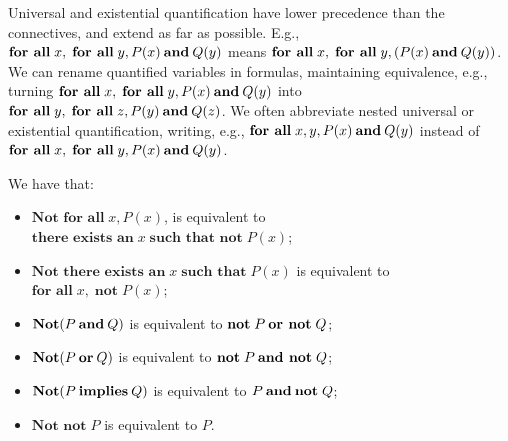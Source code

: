 Universal and existential quantification have lower precedence
than the connectives, and extend as far as possible. E.g.,
$\textbf{for all}\; x, \;\textbf{for all}\; y, P(x)\mathbin{\mathbf{and}} Q(y)$ means
$\textbf{for all}\; x, \;\textbf{for all}\; y, (P(x)\mathbin{\mathbf{and}} Q(y))$.
We can rename quantified variables in formulas, maintaining equivalence,
e.g., turning
$\textbf{for all}\; x, \;\textbf{for all}\; y, P(x)\mathbin{\mathbf{and}} Q(y)$ into
$\textbf{for all}\; y, \;\textbf{for all}\; z, P(y)\mathbin{\mathbf{and}} Q(z)$.
We often abbreviate nested universal or existential quantification,
writing, e.g., 
$\textbf{for all}\; x, y, P(x)\mathbin{\mathbf{and}} Q(y)$ instead of
$\textbf{for all}\; x, \;\textbf{for all}\; y, P(x)\mathbin{\mathbf{and}} Q(y)$.

We have that:
\begin{itemize}
\item $\textbf{Not for all}\; x, P(x)$, is equivalent to
  $\textbf{there exists an}\; x \;\textbf{such that not}\; P(x)$;

\item $\textbf{Not there exists an}\; x \;\textbf{such that}\; P(x)$ is
  equivalent to $\textbf{for all}\; x, \;\textbf{not}\; P(x)$;

\item $\textbf{Not} (P \mathbin{\mathbf{and}} Q)$ is equivalent to
  $\textbf{not}\; P \mathbin{\mathbf{or}} \,\textbf{not}\; Q$;

\item $\textbf{Not} (P \mathbin{\mathbf{or}} Q)$ is equivalent to $\textbf{not}\;
  P \mathbin{\mathbf{and}} \,\textbf{not}\; Q$;

\item $\textbf{Not} (P \mathbin{\mathbf{implies}} Q)$ is equivalent to $P
  \mathbin{\mathbf{and}} \textbf{not}\; Q$;

\item $\textbf{Not not}\; P$ is equivalent to $P$.
\end{itemize}


